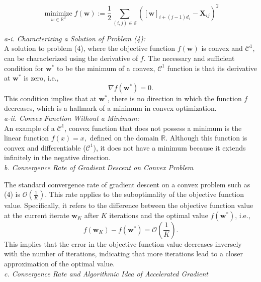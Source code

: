 \documentclass[12pt]{article}
\begin{document}
    \begin{equation}
        \underset{w \in \mathbb{R}^{d}}{\operatorname{minimize}} f(\boldsymbol{w}):=\frac{1}{2} \sum_{(i, j) \in \mathcal{S}}\left([\boldsymbol{w}]_{i+(j-1) d_{1}}-\boldsymbol{X}_{i j}\right)^{2}
    \end{equation}

    \textit{a-i. Characterizing a Solution of Problem (4):}\\
    A solution to problem (4), where the objective function \( f(\boldsymbol{w}) \) is convex and \(\mathcal{C}^{1}\), can be characterized using the derivative of \( f \). The necessary and sufficient condition for \(\boldsymbol{w}^*\) to be the minimum of a convex, \(\mathcal{C}^{1}\) function is that its derivative at \(\boldsymbol{w}^*\) is zero, i.e.,
    \[
        \nabla f(\boldsymbol{w}^*) = 0.
    \]
    This condition implies that at \(\boldsymbol{w}^*\), there is no direction in which the function \( f \) decreases, which is a hallmark of a minimum in convex optimization.\\

    \textit{a-ii. Convex Function Without a Minimum:}\\
    An example of a \(\mathcal{C}^{1}\), convex function that does not possess a minimum is the linear function
    \(
    f(x) = x,
    \)
    defined on the domain \( \mathbb{R} \). Although this function is convex and differentiable (\(\mathcal{C}^{1}\)), it does not have a minimum because it extends infinitely in the negative direction.\\

    \textit{b. Convergence Rate of Gradient Descent on Convex Problem}

    The standard convergence rate of gradient descent on a convex problem such as (4) is \(\mathcal{O}\left(\frac{1}{K}\right)\). This rate applies to the suboptimality of the objective function value. Specifically, it refers to the difference between the objective function value at the current iterate \(\boldsymbol{w}_K\) after \(K\) iterations and the optimal value \(f(\boldsymbol{w}^*)\), i.e.,
    \[
        f(\boldsymbol{w}_K) - f(\boldsymbol{w}^*) = \mathcal{O}\left(\frac{1}{K}\right).
    \]
    This implies that the error in the objective function value decreases inversely with the number of iterations, indicating that more iterations lead to a closer approximation of the optimal value.\\

    \textit{c. Convergence Rate and Algorithmic Idea of Accelerated Gradient}
\end{document}
